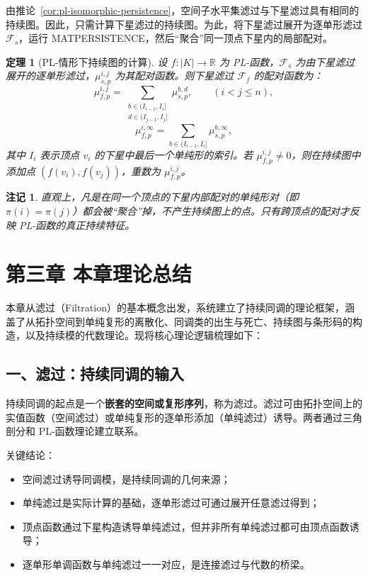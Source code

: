 \documentclass[UTF8]{ctexart}
\newtheorem{remark}[definition]{注记}
\newtheorem{theorem}[definition]{定理}
\begin{document}
由推论~\ref{cor:pl-isomorphic-persistence}，空间子水平集滤过与下星滤过具有相同的持续图。因此，只需计算下星滤过的持续图。为此，将下星滤过展开为逐单形滤过 \(\mathcal{F}_s\)，运行 MATPERSISTENCE，然后“聚合”同一顶点下星内的局部配对。

\begin{theorem}[PL-情形下持续图的计算]
\label{thm:pl-persistence-computation}
设 \(f: |K| \to \mathbb{R}\) 为 PL-函数，\(\mathcal{F}_s\) 为由下星滤过展开的逐单形滤过，\(\mu_{s,p}^{i,j}\) 为其配对函数。则下星滤过 \(\mathcal{F}_f\) 的配对函数为：
\[
\mu_{f,p}^{i,j} = \sum_{\substack{b \in (I_{i-1}, I_i] \\ d \in (I_{j-1}, I_j]}} \mu_{s,p}^{b,d}, \qquad (i < j \le n),
\]
\[
\mu_{f,p}^{i,\infty} = \sum_{b \in (I_{i-1}, I_i]} \mu_{s,p}^{b,\infty},
\]
其中 \(I_i\) 表示顶点 \(v_i\) 的下星中最后一个单纯形的索引。若 \(\mu_{f,p}^{i,j} \neq 0\)，则在持续图中添加点 \((f(v_i), f(v_j))\)，重数为 \(\mu_{f,p}^{i,j}\)。
\end{theorem}

\begin{remark}
直观上，凡是在同一个顶点的下星内部配对的单纯形对（即 \(\pi(i) = \pi(j)\)）都会被“聚合”掉，不产生持续图上的点。只有跨顶点的配对才反映 PL-函数的真正持续特征。
\end{remark}

\section*{第三章 本章理论总结}

本章从滤过（Filtration）的基本概念出发，系统建立了持续同调的理论框架，涵盖了从拓扑空间到单纯复形的离散化、同调类的出生与死亡、持续图与条形码的构造，以及持续模的代数理论。现将核心理论逻辑梳理如下：

\subsection*{一、滤过：持续同调的输入}

持续同调的起点是一个\textbf{嵌套的空间或复形序列}，称为滤过。滤过可由拓扑空间上的实值函数（空间滤过）或单纯复形的逐单形添加（单纯滤过）诱导。两者通过三角剖分和 PL-函数理论建立联系。

关键结论：
\begin{itemize}
    \item 空间滤过诱导同调模，是持续同调的几何来源；
    \item 单纯滤过是实际计算的基础，逐单形滤过可通过展开任意滤过得到；
    \item 顶点函数通过下星构造诱导单纯滤过，但并非所有单纯滤过都可由顶点函数诱导；
    \item 逐单形单调函数与单纯滤过一一对应，是连接滤过与代数的桥梁。
\end{itemize}
\end{document}
